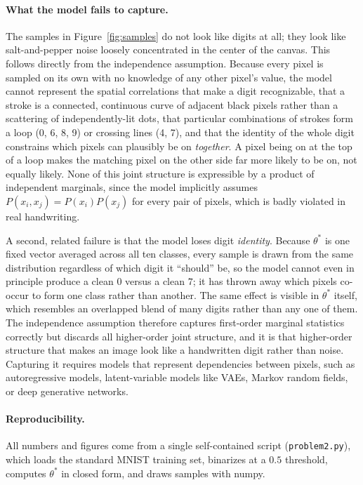 \documentclass[11pt]{article}
\begin{document}
\paragraph{What the model fails to capture.} The samples in
Figure~\ref{fig:samples} do not look like digits at all; they look like
salt-and-pepper noise loosely concentrated in the center of the canvas. This
follows directly from the independence assumption. Because every pixel is
sampled on its own with no knowledge of any other pixel's value, the model
cannot represent the spatial correlations that make a digit recognizable, that
a stroke is a connected, continuous curve of adjacent black pixels rather than
a scattering of independently-lit dots, that particular combinations of strokes
form a loop (0, 6, 8, 9) or crossing lines (4, 7), and that the identity of the
whole digit constrains which pixels can plausibly be on \emph{together}. A pixel
being on at the top of a loop makes the matching pixel on the other side far
more likely to be on, not equally likely. None of this joint structure is
expressible by a product of independent marginals, since the model implicitly
assumes $P(x_i, x_j) = P(x_i)P(x_j)$ for every pair of pixels, which is badly
violated in real handwriting.

A second, related failure is that the model loses digit \emph{identity}.
Because $\theta^{*}$ is one fixed vector averaged across all ten classes, every
sample is drawn from the same distribution regardless of which digit it
``should'' be, so the model cannot even in principle produce a clean $0$ versus
a clean $7$; it has thrown away which pixels co-occur to form one class rather
than another. The same effect is visible in $\theta^{*}$ itself, which
resembles an overlapped blend of many digits rather than any one of them. The
independence assumption therefore captures first-order marginal statistics
correctly but discards all higher-order joint structure, and it is that
higher-order structure that makes an image look like a handwritten digit rather
than noise. Capturing it requires models that represent dependencies between
pixels, such as autoregressive models, latent-variable models like VAEs, Markov
random fields, or deep generative networks.

\paragraph{Reproducibility.} All numbers and figures come from a single
self-contained script (\texttt{problem2.py}), which loads the standard MNIST
training set, binarizes at a $0.5$ threshold, computes $\theta^{*}$ in closed
form, and draws samples with numpy.
\end{document}
